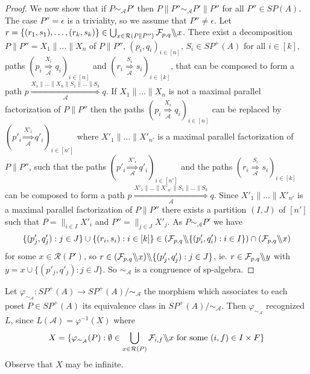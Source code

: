 \documentclass{CSML}
\newcommand{\quotientparallel}[2]{\ensuremath{#1\backslash\kern-3pt\backslash#2}}
\begin{document}
\begin{proof}
We now show that if $P\sim_{\mathcal{A}}P'$ then $P\parallel P''\sim_{\mathcal{A}}P'\parallel P''$ for all $P''\in SP(A)$. The case $P''=\epsilon$ is a triviality, so we assume that $P''\not=\epsilon$. Let $r=\{(r_1,s_1),\dots,(r_k,s_k)\}\in \mathop\bigcup_{x\in \mathcal{R}(P\parallel P'')} \quotientparallel{\mathcal{F}_{p,q}}{x}$. There exist a decomposition $P\parallel P''=X_1\parallel\dots\parallel X_n$ of $P\parallel P''$, $(p_i,q_i)_{i\in[n]}$,  $S_i\in SP^+(A)$ for all $i\in[k]$, paths $(p_i\mathop{\Longrightarrow}\limits_{\mathcal{A}}^{X_i} q_i)_{i\in[n]}$  and $(r_i\mathop{\Longrightarrow}\limits_{\mathcal{A}}^{S_i} s_i)_{i\in[k]}$,
 that can be composed to form a path $p  \mathop{\Longrightarrow}\limits_{\mathcal{A}}^{X_1\parallel\dots\parallel X_n\parallel S_1\parallel\dots\parallel S_k} q$. If $X_1\parallel\dots\parallel X_n$ is not a maximal parallel factorization of $P\parallel P''$ then the paths $(p_i\mathop{\Longrightarrow}\limits_{\mathcal{A}}^{X_i} q_i)_{i\in[n]}$ can be replaced by $(p'_i\mathop{\Longrightarrow}\limits_{\mathcal{A}}^{X'_i} q'_i)_{i\in[n']}$ where $X'_1\parallel\dots\parallel X'_{n'}$ is a maximal parallel factorization of $P\parallel P''$, such that the paths $(p'_i\mathop{\Longrightarrow}\limits_{\mathcal{A}}^{X'_i} q'_i)_{i\in[n']}$ and the paths $(r_i\mathop{\Longrightarrow}\limits_{\mathcal{A}}^{S_i} s_i)_{i\in[k]}$ can be composed to form a path $p  \mathop{\Longrightarrow}\limits_{\mathcal{A}}^{X'_1\parallel\dots\parallel X'_{n'}\parallel S_1\parallel\dots\parallel S_k} q$. Since $X'_1\parallel\dots\parallel X'_{n'}$ is a maximal parallel factorization of $P\parallel P''$ there exists a partition $(I,J)$ of $[n']$ such that $P=\parallel_{i\in I} X'_i$ and $P''=\parallel_{j\in J} X'_j$. As $P\sim_{\mathcal{A}}P'$ we have
$$\{(p'_j,q'_j):j\in J\}\cup\{(r_i,s_i) : i\in[k]\}\in (\quotientparallel{\mathcal{F}_{p,q}}{\{(p'_i,q'_i):i\in I\}})\cap (\quotientparallel{\mathcal{F}_{p,q}}{x})$$
for some $x\in\mathcal{R}(P')$, 
so
$r\in \quotientparallel{(\quotientparallel{\mathcal{F}_{p,q}}{x})}{\{(p'_j,q'_j):j\in J\}}$, ie. $r\in \quotientparallel{\mathcal{F}_{p,q}}{y}$ with $y=x\cup \{(p'_j,q'_j):j\in J\}$.
  So $\sim_{\mathcal{A}}$ is a congruence of sp-algebra. 
\end{proof}

Let $\varphi_{\sim_{\mathcal{A}}}:SP^+(A)\to SP^+(A)/\mathord\sim_\mathcal{A}$ the morphism which associates to each poset $P\in SP^+(A)$ its equivalence class in $SP^+(A)/\mathord\sim_\mathcal{A}$. Then $\varphi_{\sim_{\mathcal{A}}}$ recognized $L$, since $L(\mathcal{A})=\varphi^{-1}(X)$ where
$$
X=\{\varphi_{\sim_{\mathcal{A}}}(P) : \emptyset\in\mathop\bigcup_{x\in \mathcal{R}(P)}\quotientparallel{\mathcal{F}_{i,f}}{x}\text{ for some }(i,f)\in I\times F\}
$$
Observe that $X$ may be infinite.
\end{document}

